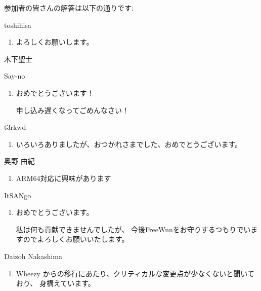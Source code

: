 \documentclass[mingoth,a4paper]{jsarticle}
\begin{document}
参加者の皆さんの解答は以下の通りです:

\begin{prework}{ toshihisa }
  \begin{enumerate}
  \item よろしくお願いします。
  \end{enumerate}
\end{prework}

\begin{prework}{ 木下聖士 }
\end{prework}

\begin{prework}{ Say-no }
  \begin{enumerate}
  \item おめでとうございます！ 

    申し込み遅くなってごめんなさい！
  \end{enumerate}
\end{prework}

\begin{prework}{ t3rkwd }
  \begin{enumerate}
  \item いろいろありましたが、おつかれさまでした、おめでとうございます。
  \end{enumerate}
\end{prework}

\begin{prework}{ 奥野 由紀 }
  \begin{enumerate}
  \item ARM64対応に興味があります
  \end{enumerate}
\end{prework}

\begin{prework}{ ItSANgo }
  \begin{enumerate}
  \item おめでとうございます。

    私は何も貢献できませんでしたが、 今後FreeWnnをお守りするつもりでいますのでよろしくお願いいたします。
  \end{enumerate}
\end{prework}

\begin{prework}{ Daizoh Nakashima }
  \begin{enumerate}
  \item Wheezy からの移行にあたり、クリティカルな変更点が少なくないと聞いており、
    身構えています。
  \end{enumerate}
\end{prework}
\end{document}
